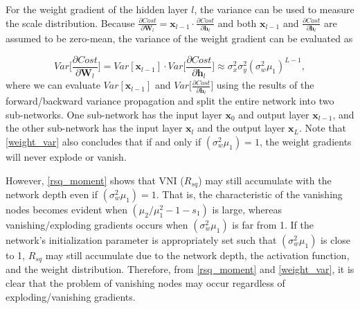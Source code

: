 For the weight gradient of the hidden layer $l$, the variance can be used to measure the scale distribution. Because $\frac{\partial Cost}{\partial \mathbf{W}_l}
=\mathbf{x}_{l-1}\cdot\frac{\partial Cost}{\partial \mathbf{h}_l}$ and both $\mathbf{x}_{l-1}$ and $\frac{\partial Cost}{\partial \mathbf{h}_l}$ are assumed to be zero-mean, the variance of the weight gradient can be evaluated as

\begin{equation}
    Var\Big[\frac{\partial Cost}{\partial \mathbf{W}_l}\Big]
    =
    Var[\mathbf{x}_{l-1}]\cdot
    Var\Big[\frac{\partial Cost}{\partial \mathbf{h}_l}\Big]
    \approx
    \sigma_x^2\sigma_y^2(\sigma_w^2\mu_1)^{L-1},
    \label{weight_var}
\end{equation}
where we can evaluate $Var[\mathbf{x}_{l-1}]$ and $Var\Big[\frac{\partial Cost}{\partial \mathbf{h}_l}\Big]$ using the results of the forward/backward variance propagation and split the entire network into two sub-networks. One sub-network has the input layer $\mathbf{x}_{0}$ and output layer $\mathbf{x}_{l-1}$, and the other sub-network has the input layer $\mathbf{x}_{l}$ and the output layer $\mathbf{x}_{L}$. Note that \eqref{weight_var} also concludes that if and only if $(\sigma_w^2\mu_1)=1$, the weight gradients will never explode or vanish.

However, \eqref{rsq_moment} shows that VNI ($R_{sq}$) may still accumulate with the network depth even if $(\sigma_w^2\mu_1)=1$. That is, the characteristic of the vanishing nodes becomes evident  when $(\mu_2/\mu_1^2-1-s_1)$ is large, whereas vanishing/exploding gradients occurs when $(\sigma_w^2\mu_1)$ is far from 1. If the network's initialization parameter is appropriately set such that $(\sigma_w^2\mu_1)$ is close to 1, $R_{sq}$ may still accumulate due to the network depth, the activation function, and the weight distribution. Therefore, from \eqref{rsq_moment} and \eqref{weight_var}, it is clear that the problem of vanishing nodes  may occur regardless of  exploding/vanishing gradients.

